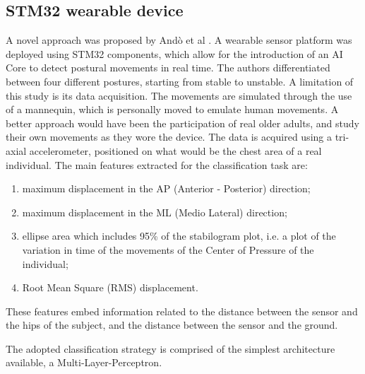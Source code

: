 \subsection{STM32 wearable device}
A novel approach was proposed by Andò et al \cite{PosturalClasses}. A wearable sensor platform was deployed using STM32 components, which allow for the introduction of an AI Core to detect postural movements in real time. The authors differentiated between four different postures, starting from stable to unstable. 
A limitation of this study is its data acquisition. The movements are simulated through the use of a mannequin, which is personally moved to emulate human movements. A better approach would have been the participation of real older adults, and study their own movements as they wore the device. The data is acquired using a tri-axial accelerometer, positioned on what would be the chest area of a real individual. 
The main features extracted for the classification task are:
\begin{enumerate}
    \itemsep0cm 
    \item maximum displacement in the AP (Anterior - Posterior) direction;
    \item maximum displacement in the ML (Medio Lateral) direction;
    \item ellipse area which includes 95\% of the stabilogram plot, i.e. a plot of the variation in time of the movements of the Center of Pressure of the individual;  
    \item Root Mean Square (RMS) displacement.
\end{enumerate}
These features embed information related to the distance between the sensor and the hips of the subject, and the distance between the sensor and the ground. 

The adopted classification strategy is comprised of the simplest architecture available, a Multi-Layer-Perceptron.

